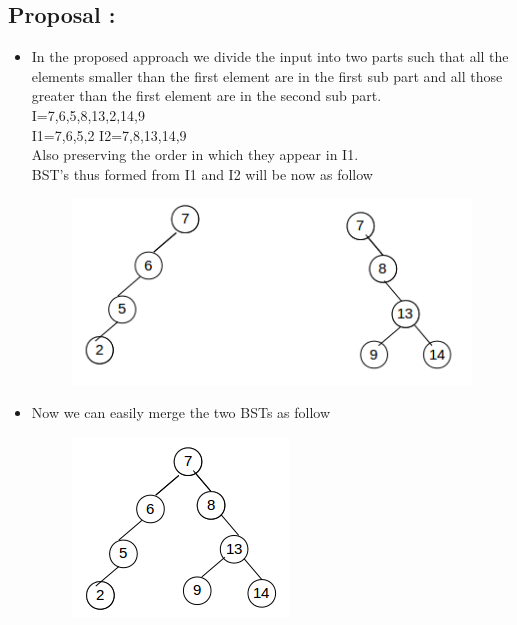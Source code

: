 \documentclass{article}
\begin{document}
	\subsection{Proposal :}
	\begin{itemize}
		\item In the proposed approach we divide the input into two parts such that all the elements smaller than the first element are in the first sub part and all those greater than the first element are in the second sub part.\\
		I={7,6,5,8,13,2,14,9}\\
		
		I1={7,6,5,2} I2={7,8,13,14,9}\\
		Also preserving the order in which they appear in I1.\\
		BST's thus formed from I1 and I2 will be now as follow\\
		\begin{figure}[h!]
			\centering
			\includegraphics[scale=0.7]{r.png}
		\end{figure}
		
		\item Now we can easily merge the two BSTs as follow\\
		\begin{figure}[h!]
			\centering
			\includegraphics[scale=0.7]{s.png}
		\end{figure}
		
	\end{itemize}
\end{document}
